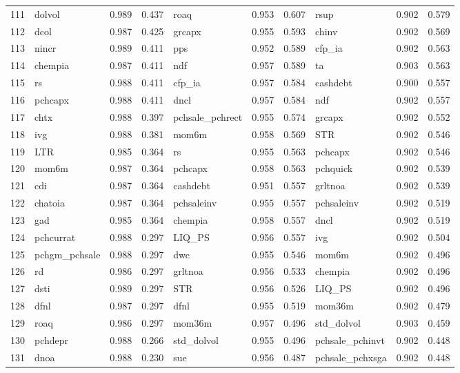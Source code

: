 \begin{landscape}
\begin{footnotesize}
\begin{longtable}{l|lcc|lcc|lcc}
  111 & dolvol & 0.989 & 0.437 & roaq & 0.953 & 0.607 & rsup & 0.902 & 0.579 \\ 
  112 & dcol & 0.987 & 0.425 & grcapx & 0.955 & 0.593 & chinv & 0.902 & 0.569 \\ 
  113 & nincr & 0.989 & 0.411 & pps & 0.952 & 0.589 & cfp\_ia & 0.902 & 0.563 \\ 
  114 & chempia & 0.987 & 0.411 & ndf & 0.957 & 0.589 & ta & 0.903 & 0.563 \\ 
  115 & rs & 0.988 & 0.411 & cfp\_ia & 0.957 & 0.584 & cashdebt & 0.900 & 0.557 \\ 
  116 & pchcapx & 0.988 & 0.411 & dncl & 0.957 & 0.584 & ndf & 0.902 & 0.557 \\ 
  117 & chtx & 0.988 & 0.397 & pchsale\_pchrect & 0.955 & 0.574 & grcapx & 0.902 & 0.552 \\ 
  118 & ivg & 0.988 & 0.381 & mom6m & 0.958 & 0.569 & STR & 0.902 & 0.546 \\ 
  119 & LTR & 0.985 & 0.364 & rs & 0.955 & 0.563 & pchcapx & 0.902 & 0.546 \\ 
  120 & mom6m & 0.987 & 0.364 & pchcapx & 0.958 & 0.563 & pchquick & 0.902 & 0.539 \\ 
  121 & cdi & 0.987 & 0.364 & cashdebt & 0.951 & 0.557 & grltnoa & 0.902 & 0.539 \\ 
  122 & chatoia & 0.987 & 0.364 & pchsaleinv & 0.955 & 0.557 & pchsaleinv & 0.902 & 0.519 \\ 
  123 & gad & 0.985 & 0.364 & chempia & 0.958 & 0.557 & dncl & 0.902 & 0.519 \\ 
  124 & pchcurrat & 0.988 & 0.297 & LIQ\_PS & 0.956 & 0.557 & ivg & 0.902 & 0.504 \\ 
  125 & pchgm\_pchsale & 0.988 & 0.297 & dwc & 0.955 & 0.546 & mom6m & 0.902 & 0.496 \\ 
  126 & rd & 0.986 & 0.297 & grltnoa & 0.956 & 0.533 & chempia & 0.902 & 0.496 \\ 
  127 & dsti & 0.989 & 0.297 & STR & 0.956 & 0.526 & LIQ\_PS & 0.902 & 0.496 \\ 
  128 & dfnl & 0.987 & 0.297 & dfnl & 0.955 & 0.519 & mom36m & 0.902 & 0.479 \\ 
  129 & roaq & 0.986 & 0.297 & mom36m & 0.957 & 0.496 & std\_dolvol & 0.903 & 0.459 \\ 
  130 & pchdepr & 0.988 & 0.266 & std\_dolvol & 0.955 & 0.496 & pchsale\_pchinvt & 0.902 & 0.448 \\ 
  131 & dnoa & 0.988 & 0.230 & sue & 0.956 & 0.487 & pchsale\_pchxsga & 0.902 & 0.448 \\ 

\end{longtable}
\end{footnotesize}
\end{landscape}
